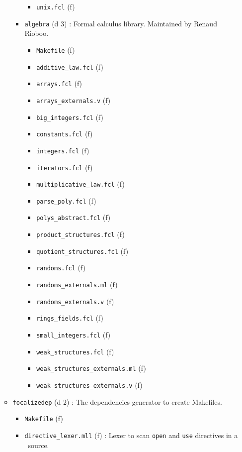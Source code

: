 \begin{itemize}
\begin{itemize}
\begin{itemize}
\begin{itemize}
      \item{\tt unix.fcl} (f)
      \end{itemize}
    \item {\tt algebra} (d 3) : Formal calculus library. Maintained by
      Renaud Rioboo.
      \begin{itemize}
      \item {\tt Makefile} (f)
      \item {\tt additive\_law.fcl} (f)
      \item {\tt arrays.fcl} (f)
      \item {\tt arrays\_externals.v} (f)
      \item {\tt big\_integers.fcl} (f)
      \item {\tt constants.fcl} (f)
      \item {\tt integers.fcl} (f)
      \item {\tt iterators.fcl} (f)
      \item {\tt multiplicative\_law.fcl} (f)
      \item {\tt parse\_poly.fcl} (f)
      \item {\tt polys\_abstract.fcl} (f)
      \item {\tt product\_structures.fcl} (f)
      \item {\tt quotient\_structures.fcl} (f)
      \item {\tt randoms.fcl} (f)
      \item {\tt randoms\_externals.ml} (f)
      \item {\tt randoms\_externals.v} (f)
      \item {\tt rings\_fields.fcl} (f)
      \item {\tt small\_integers.fcl} (f)
      \item {\tt weak\_structures.fcl} (f)
      \item {\tt weak\_structures\_externals.ml} (f)
      \item {\tt weak\_structures\_externals.v} (f)
      \end{itemize}
    \end{itemize}
  \item {\tt focalizedep} (d 2) : The dependencies generator to create
    Makefiles.
    \begin{itemize}
    \item {\tt Makefile} (f)
    \item {\tt directive\_lexer.mll} (f) : Lexer to scan {\tt open}
      and {\tt use} directives in a \focalize\ source.

\end{itemize}
\end{itemize}
\end{itemize}
